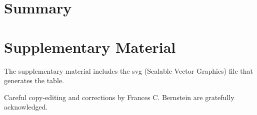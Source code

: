 \documentclass[preprint]{iucr}              %
\numberwithin{equation}{section}
\newcommand{\SVI}[0]{$\bf{S^{6}}$}
\begin{document}
	
	\section{Summary}
	
\section{Supplementary Material}

The supplementary material includes the 
svg (Scalable Vector Graphics) file that generates the table.
	
	
	
	
	
	Careful copy-editing and corrections by Frances C. Bernstein are 
	gratefully acknowledged.

	
	
	
	
	
	
	
	
	
	
	
	
	
\end{document}
